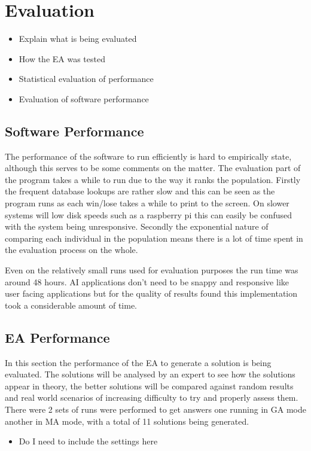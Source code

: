 \documentclass[a4paper]{article}
\begin{document}
\section{Evaluation}
\begin{itemize}
	\item Explain what is being evaluated
	\item How the EA was tested
	\item Statistical evaluation of performance
	\item Evaluation of software performance
\end{itemize}
\subsection{Software Performance}
The performance of the software to run efficiently is hard to empirically state, although this serves to be some comments on the matter.
The evaluation part of the program takes a while to run due to the way it ranks the population.
Firstly the frequent database lookups are rather slow and this can be seen as the program runs as each win/lose takes a while to print to the screen.
On slower systems will low disk speeds such as a raspberry pi this can easily be confused with the system being unresponsive.
Secondly the exponential nature of comparing each individual in the population means there is a lot of time spent in the evaluation process on the whole.
\par
Even on the relatively small runs used for evaluation purposes the run time was around 48 hours.
AI applications don't need to be snappy and responsive like user facing applications but for the quality of results found this implementation took a considerable amount of time.
\subsection{EA Performance}
In this section the performance of the EA to generate a solution is being evaluated.
The solutions will be analysed by an expert to see how the solutions appear in theory, the better solutions will be compared against random results and real world scenarios of increasing difficulty to try and properly assess them.
There were 2 sets of runs were performed to get answers one running in GA mode another in MA mode, with a total of 11 solutions being generated.
\begin{itemize}
	\item Do I need to include the settings here
\end{itemize}
\end{document}
